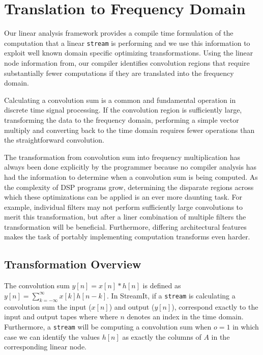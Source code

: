 
\section{Translation to Frequency Domain}
\label{sec:freq}

Our linear analysis framework provides a compile time formulation of
the computation that a linear {\tt stream} is performing and we
use this information to exploit well known domain specific optimizing
transformations.  Using the linear node information from, our compiler
identifies convolution regions that require substantially fewer
computations if they are translated into the frequency domain.

Calculating a convolution sum is a common and fundamental operation in
discrete time signal processing.  If the convolution region is
sufficiently large, transforming the data to the frequency domain,
performing a simple vector multiply and converting back to the time
domain requires fewer operations than the straightforward convolution.

The transformation from convolution sum into frequency multiplication
has always been done explicitly by the programmer because no compiler
analysis has had the information to determine when a convolution sum
is being computed.  As the complexity of DSP programs grow,
determining the disparate regions across which these optimizations can
be applied is an ever more daunting task. For example, individual
filters may not perform sufficiently large convolutions to merit this
transformation, but after a liner combination of multiple filters the
transformation will be beneficial.  Furthermore, differing
architectural features makes the task of portably implementing 
computation transforms even harder.

\subsection{Transformation Overview}
The convolution sum $y[n]=x[n]*h[n]$ is defined as
$y[n]=\sum_{k=-\infty}^{\infty}x[k]h[n-k]$. In StreamIt, if a 
{\tt stream} is calculating a convolution sum the input
($x[n]$) and output ($y[n]$), correspond exactly to the input and
output tapes where where $n$ denotes an index in the time domain.  
Furthermore, a {\tt stream} will be computing a
convolution sum when $o=1$ in which case we can identify the values
$h[n]$ as exactly the columns of $A$ in the corresponding linear node.

